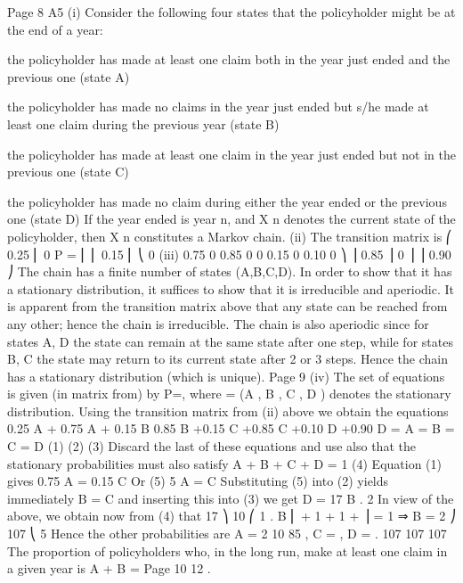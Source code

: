 \documentclass[a4paper,12pt]{article}
\begin{document}
Page 8
A5
(i)
Consider the following four states that the policyholder might be at the end of
a year:
\item  the policyholder has made at least one claim both in the year just ended
and the previous one (state A)
\item  the policyholder has made no claims in the year just ended but s/he made
at least one claim during the previous year (state B)
\item  the policyholder has made at least one claim in the year just ended but not
in the previous one (state C)
\item  the policyholder has made no claim during either the year ended or the
previous one (state D)
If the year ended is year n, and X n denotes the current state of the policyholder,
then X n constitutes a Markov chain.
(ii)
The transition matrix is
⎛ 0.25
⎜
0
P = ⎜
⎜ 0.15
⎜
⎝ 0
(iii)
0.75
0
0.85
0
0
0.15
0
0.10
0 ⎞
⎟
0.85 ⎟
0 ⎟
⎟
0.90 ⎠
The chain has a finite number of states (A,B,C,D). In order to show that it has
a stationary distribution, it suffices to show that it is irreducible and aperiodic.
It is apparent from the transition matrix above that any state can be reached
from any other; hence the chain is irreducible.
The chain is also aperiodic since for states A, D the state can remain at the
same state after one step, while for states B, C the state may return to its
current state after 2 or 3 steps.
Hence the chain has a stationary distribution (which is unique).
Page 9
(iv)
The set of equations is given (in matrix from) by \pi P=\pi ,
where \pi  = (\pi  A , \pi  B , \pi  C , \pi  D ) denotes the stationary distribution.
Using the transition matrix from (ii) above we obtain the equations
0.25 \pi  A +
0.75 \pi  A +
0.15 \pi  B
0.85 \pi  B
+0.15 \pi  C
+0.85 \pi  C
+0.10 \pi  D
+0.90 \pi  D
= \pi  A
= \pi  B
= \pi  C
= \pi  D
(1)
(2)
(3)
Discard the last of these equations and use also that the stationary probabilities
must also satisfy
\pi  A + \pi  B + \pi  C + \pi  D = 1
(4)
Equation (1) gives
0.75 \pi  A = 0.15 \pi  C
Or
(5)
5 \pi  A = \pi  C
Substituting (5) into (2) yields immediately
\pi  B = \pi  C
and inserting this into (3) we get
\pi  D =
17
\pi  B .
2
In view of the above, we obtain now from (4) that
17 ⎞
10
⎛ 1
.
\pi  B ⎜ + 1 + 1 + ⎟ = 1 ⇒ \pi  B =
2 ⎠
107
⎝ 5
Hence the other probabilities are
\pi  A =
2
10
85
, \pi  C =
, \pi  D =
.
107
107
107
The proportion of policyholders who, in the long run, make at least one claim
in a given year is
\pi  A + \pi  B =
Page 10
12
.
\end{document}
